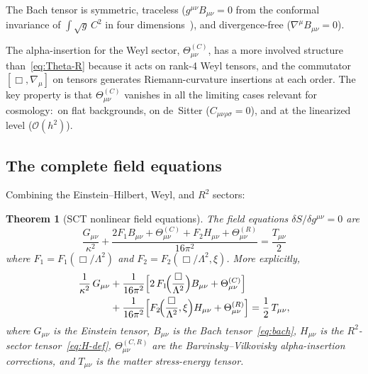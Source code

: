 \documentclass[12pt,a4paper]{article}
\newcommand{\order}{\mathcal{O}}
\newcommand{\Lam}{\Lambda}
\theoremstyle{plain}
\newtheorem{theorem}{Theorem}[section]
\theoremstyle{definition}
\begin{document}
\noindent
The Bach tensor is symmetric, traceless ($g^{\mu\nu}B_{\mu\nu} = 0$ from
the conformal invariance of $\int\sqrt{g}\,C^2$ in four
dimensions~\cite{Stelle:1978}), and divergence-free
($\nabla^\mu B_{\mu\nu} = 0$).

The alpha-insertion for the Weyl sector, $\Theta^{(C)}_{\mu\nu}$, has a
more involved structure than~\eqref{eq:Theta-R} because it acts on rank-4
Weyl tensors, and the commutator $[\Box, \nabla_\mu]$ on tensors generates
Riemann-curvature insertions at each order.  The key property is that
$\Theta^{(C)}_{\mu\nu}$ vanishes in all the limiting cases relevant for
cosmology:\ on flat backgrounds, on de~Sitter
($C_{\mu\nu\rho\sigma} = 0$), and at the linearized level
($\order(h^2)$).

\subsection{The complete field equations}

Combining the Einstein--Hilbert, Weyl, and $R^2$ sectors:

\begin{theorem}[SCT nonlinear field equations]
\label{thm:field-eqs}
The field equations $\delta S/\delta g^{\mu\nu} = 0$ are
\begin{equation}\label{eq:full-eom}
  \boxed{\;
  \frac{G_{\mu\nu}}{\kappa^2}
  + \frac{2F_1 B_{\mu\nu}
    + \Theta^{(C)}_{\mu\nu}
    + F_2 H_{\mu\nu}
    + \Theta^{(R)}_{\mu\nu}}{16\pi^2}
  = \frac{T_{\mu\nu}}{2}\;
  }
\end{equation}
where $F_1 = F_1(\Box/\Lam^2)$ and $F_2 = F_2(\Box/\Lam^2,\xi)$.
More explicitly,
\begin{align}\label{eq:full-eom-expanded}
  \frac{1}{\kappa^2}\,G_{\mu\nu}
  &+ \frac{1}{16\pi^2}\Bigl[2\,F_1\!\Bigl(\frac{\Box}{\Lam^2}\Bigr)
    B_{\mu\nu}
    + \Theta^{(C)}_{\mu\nu}\Bigr] \notag\\
  &+ \frac{1}{16\pi^2}\Bigl[F_2\!\Bigl(\frac{\Box}{\Lam^2},\xi\Bigr)
    H_{\mu\nu}
    + \Theta^{(R)}_{\mu\nu}\Bigr]
  = \frac{1}{2}\,T_{\mu\nu},
\end{align}
where $G_{\mu\nu}$ is the Einstein tensor, $B_{\mu\nu}$ is the Bach
tensor~\eqref{eq:bach}, $H_{\mu\nu}$ is the $R^2$-sector
tensor~\eqref{eq:H-def}, $\Theta^{(C,R)}_{\mu\nu}$ are the
Barvinsky--Vilkovisky alpha-insertion corrections, and $T_{\mu\nu}$ is the
matter stress-energy tensor.
\end{theorem}
\end{document}

